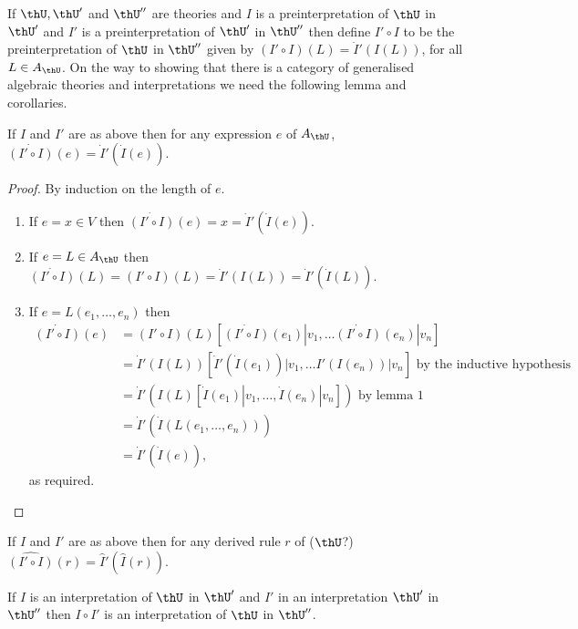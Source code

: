   If $\thU,\thU'$ and $\thU''$ are theories and $I$ is a preinterpretation of $\thU$ in $\thU'$ and $I'$ is a preinterpretation of $\thU'$ in $\thU''$ then define $I'\circ I$ to be the preinterpretation of $\thU$ in $\thU''$ given by $(I'\circ I)(L) = \dot I'(I(L))$, for all $L\in A_\thU$.
  On the way to showing that there is a category of generalised algebraic theories and interpretations we need the following lemma and corollaries.

  \begin{lemma}[3]
    If $I$ and $I'$ are as above then for any expression $e$ of $A_\thU$, $\dot{(I'\circ I)}(e) = \dot I'(\dot I(e)).$
  \end{lemma}
  \begin{proof}
    By induction on the length of $e$.
    \begin{enumerate}
      \item If $e = x\in V$ then $\dot{(I'\circ I)}(e)= x = \dot I'(\dot I(e)).$
      \item If $e=L\in A_\thU$ then $\dot{(I'\circ I)}(L) = (I'\circ I)(L) = \dot I'(I(L)) = \dot I'(\dot I(L)).$
      \item If $e = L(e_1,\ldots,e_n)$ then
        \begin{align*}
          \dot{(I'\circ I)}(e) &= (I'\circ I)(L)[\dot{(I'\circ I)}(e_1)|v_1,\ldots\dot{(I'\circ I)}(e_n)|v_n] \\
          &= \dot I'(I(L))[\dot I'(\dot I(e_1))|v_1,\ldots I'(I(e_n))|v_n] \text{ by the inductive hypothesis}\\
          &=\dot I'(I(L)[\dot I(e_1)|v_1,\ldots,\dot I(e_n)|v_n]) \text{ by lemma 1}\\
          &=\dot I'(\dot I(L(e_1,\ldots,e_n)))\\
          &=\dot I'(\dot I(e)),
        \end{align*}
        as required.
    \end{enumerate}
  \end{proof}

  \begin{corollary}[4]
    If $I$ and $I'$ are as above then for any derived rule $r$ of ($\thU$?)  $\widehat{(I'\circ I)}(r) = \hat I'(\hat I(r)).$
  \end{corollary}

  \begin{corollary}[5]
    If $I$ is an interpretation of $\thU$ in $\thU'$ and $I'$ in an interpretation $\thU'$ in $\thU''$ then $I\circ I'$ is an interpretation of $\thU$ in $\thU''$.
  \end{corollary}

